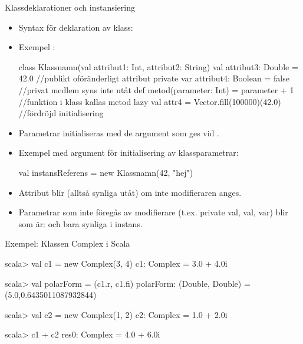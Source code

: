 \begin{Slide}{Klassdeklarationer och instansiering}\SlideFontSmall
\setlength{\leftmargini}{0pt}
\begin{itemize}
\item Syntax för deklaration av klass: \\ \vspace{0.5em}



\item Exempel :
\begin{Code}
class Klassnamn(val attribut1: Int, attribut2: String){  
  val attribut3: Double = 42.0              //publikt oföränderligt attribut
  private var attribut4: Boolean = false    //privat medlem syns inte utåt
  def metod(parameter: Int) = parameter + 1 //funktion i klass kallas metod
  lazy val attr4 = Vector.fill(100000)(42.0)     //fördröjd initialisering 
}
\end{Code}

\item Parametrar initialiseras med de argument som ges vid . 
\item Exempel  med argument för initialisering av klassparametrar:
\begin{Code}
val instansReferens = new Klassnamn(42, "hej")
\end{Code}

\item Attribut blir  (alltså synliga utåt) om inte modifieraren  anges.
\item Parametrar som inte föregås av modifierare (t.ex. private val, val, var) blir  som är:  och bara synliga i  instans.

\end{itemize}
\end{Slide}


\begin{Slide}{Exempel: Klassen Complex i Scala}\SlideFontSmall
{}

\begin{REPL}
scala> val c1 = new Complex(3, 4)
c1: Complex = 3.0 + 4.0i

scala> val polarForm = (c1.r, c1.fi)
polarForm: (Double, Double) = (5.0,0.6435011087932844)

scala> val c2 = new Complex(1, 2)
c2: Complex = 1.0 + 2.0i

scala> c1 + c2
res0: Complex = 4.0 + 6.0i
\end{REPL}
\end{Slide}



